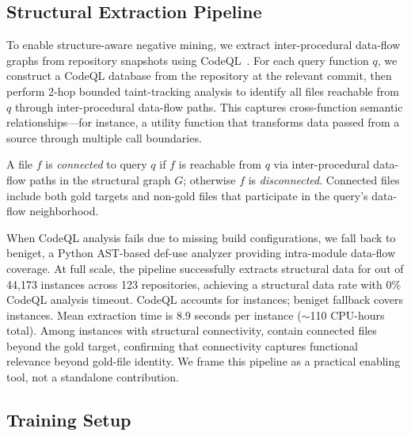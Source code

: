 \subsection{Structural Extraction Pipeline}
\label{sec:extraction}

To enable structure-aware negative mining, we extract inter-procedural data-flow graphs from repository snapshots using CodeQL~\cite{avgustinov2016ql}.
For each query function $q$, we construct a CodeQL database from the repository at the relevant commit, then perform 2-hop bounded taint-tracking analysis to identify all files reachable from $q$ through inter-procedural data-flow paths.
This captures cross-function semantic relationships---for instance, a utility function that transforms data passed from a source through multiple call boundaries.

A file $f$ is \emph{connected} to query $q$ if $f$ is reachable from $q$ via inter-procedural data-flow paths in the structural graph $G$; otherwise $f$ is \emph{disconnected}.
Connected files include both gold targets and non-gold files that participate in the query's data-flow neighborhood.

When CodeQL analysis fails due to missing build configurations, we fall back to beniget, a Python AST-based def-use analyzer providing intra-module data-flow coverage.
At full scale, the pipeline successfully extracts structural data for  out of 44,173 instances across 123 repositories, achieving a  structural data rate with 0\% CodeQL analysis timeout.
CodeQL accounts for  instances; beniget fallback covers  instances.
Mean extraction time is 8.9 seconds per instance ($\sim$110 CPU-hours total).
Among instances with structural connectivity,  contain connected files beyond the gold target, confirming that connectivity captures functional relevance beyond gold-file identity.
We frame this pipeline as a practical enabling tool, not a standalone contribution.

\subsection{Training Setup}
\label{sec:training}

